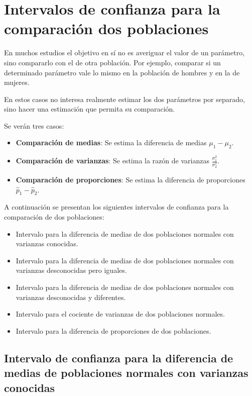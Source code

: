 \documentclass[
  spanish,
  a4paper,
]{scrreport}
\providecommand{\tightlist}{%
  \setlength{\itemsep}{0pt}\setlength{\parskip}{0pt}}
\theoremstyle{plain}
\theoremstyle{definition}
\theoremstyle{definition}
\theoremstyle{remark}
\begin{document}
\section{Intervalos de confianza para la comparación dos
poblaciones}\label{intervalos-de-confianza-para-la-comparaciuxf3n-dos-poblaciones}

En muchos estudios el objetivo en sí no es averiguar el valor de un
parámetro, sino compararlo con el de otra población. Por ejemplo,
comparar si un determinado parámetro vale lo mismo en la población de
hombres y en la de mujeres.

En estos casos no interesa realmente estimar los dos parámetros por
separado, sino hacer una estimación que permita su comparación.

Se verán tres casos:

\begin{itemize}
\tightlist
\item
  \textbf{Comparación de medias}: Se estima la diferencia de medias
  \(\mu_1-\mu_2\).
\item
  \textbf{Comparación de varianzas}: Se estima la razón de varianzas
  \(\displaystyle \frac{\sigma^2_1}{\sigma^2_2}\).
\item
  \textbf{Comparación de proporciones}: Se estima la diferencia de
  proporciones \(\hat p_1-\hat p_2\).
\end{itemize}

A continuación se presentan los siguientes intervalos de confianza para
la comparación de dos poblaciones:

\begin{itemize}
\tightlist
\item
  Intervalo para la diferencia de medias de dos poblaciones normales con
  varianzas conocidas.
\item
  Intervalo para la diferencia de medias de dos poblaciones normales con
  varianzas desconocidas pero iguales.
\item
  Intervalo para la diferencia de medias de dos poblaciones normales con
  varianzas desconocidas y diferentes.
\item
  Intervalo para el cociente de varianzas de dos poblaciones normales.
\item
  Intervalo para la diferencia de proporciones de dos poblaciones.
\end{itemize}

\subsection{Intervalo de confianza para la diferencia de medias de
poblaciones normales con varianzas
conocidas}\label{intervalo-de-confianza-para-la-diferencia-de-medias-de-poblaciones-normales-con-varianzas-conocidas}
\end{document}
